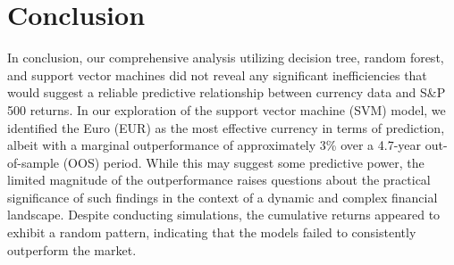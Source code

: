 \section{Conclusion}
\label{Conclusion}
In conclusion, our comprehensive analysis utilizing decision tree, random forest, and support vector machines did not reveal any significant inefficiencies that would suggest a reliable predictive relationship between currency data and S\&P 500 returns. In our exploration of the support vector machine (SVM) model, we identified the Euro (EUR) as the most effective currency in terms of prediction, albeit with a marginal outperformance of approximately 3\% over a 4.7-year out-of-sample (OOS) period. While this may suggest some predictive power, the limited magnitude of the outperformance raises questions about the practical significance of such findings in the context of a dynamic and complex financial landscape. Despite conducting simulations, the cumulative returns appeared to exhibit a random pattern, indicating that the models failed to consistently outperform the market.
